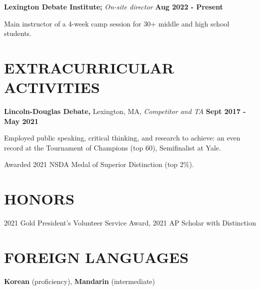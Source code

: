 \documentclass[11pt]{article}
\begin{document}
\raggedright
\textbf{Lexington Debate Institute;} \textit{On-site director} \hfill \textbf{Aug 2022 - Present} 
\begin{sublist}
	\item Main instructor of a 4-week camp session for 30+ middle and high school students. 
\end{sublist}

\section*{EXTRACURRICULAR ACTIVITIES}
\textbf{Lincoln-Douglas Debate,} Lexington, MA, \textit{Competitor and TA} \hfill \textbf{Sept 2017 - May 2021}
\begin{sublist}
  \item Employed public speaking, critical thinking, and research to achieve: an even record at the Tournament of Champions (top 60), Semifinalist at Yale.
  \item Awarded 2021 NSDA Medal of Superior Distinction (top 2\%).
\end{sublist}

\section*{HONORS}
2021 Gold President’s Volunteer Service Award, 2021 AP Scholar with Distinction

\section*{FOREIGN LANGUAGES}
\textbf{Korean} (proficiency), \textbf{Mandarin} (intermediate)
\end{document}
